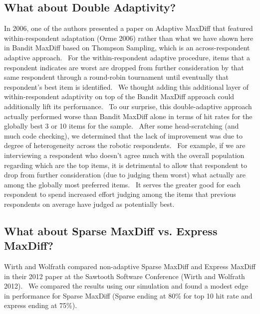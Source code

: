 \documentclass[mksc,blindrev]{informs3} %
\begin{document}
\subsection{What about Double Adaptivity?}
In 2006, one of the authors presented a paper on Adaptive MaxDiff that featured within-respondent adaptation (Orme 2006) rather than what we have shown here in Bandit MaxDiff based on Thompson Sampling, which is an across-respondent adaptive approach.  For the within-respondent adaptive procedure, items that a respondent indicates are worst are dropped from further consideration by that same respondent through a round-robin tournament until eventually that respondent’s best item is identified.  We thought adding this additional layer of within-respondent adaptivity on top of the Bandit MaxDiff approach could additionally lift its performance.  To our surprise, this double-adaptive approach actually performed worse than Bandit MaxDiff alone in terms of hit rates for the globally best 3 or 10 items for the sample.  After some head-scratching (and much code checking), we determined that the lack of improvement was due to degree of heterogeneity across the robotic respondents.  For example, if we are interviewing a respondent who doesn't agree much with the overall population regarding which are the top items, it is detrimental to allow that respondent to drop from further consideration (due to judging them worst) what actually are among the globally most preferred items.  It serves the greater good for each respondent to spend increased effort judging among the items that previous respondents on average have judged as potentially best.
\subsection{What about Sparse MaxDiff vs. Express MaxDiff?}
Wirth and Wolfrath compared non-adaptive Sparse MaxDiff and Express MaxDiff in their 2012 paper at the Sawtooth Software Conference (Wirth and Wolfrath 2012).  We compared the results using our simulation and found a modest edge in performance for Sparse MaxDiff (Sparse ending at 80\% for top 10 hit rate and express ending at 75\%).
\end{document}
